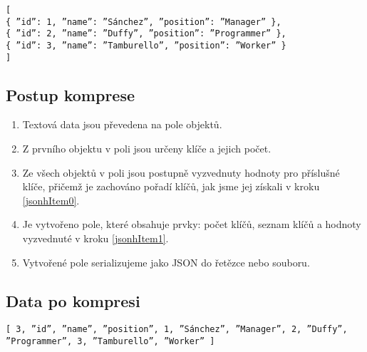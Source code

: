\texttt{[\\
\hspace*{5mm}\{ \textquotedblright id\textquotedblright : 1, \textquotedblright name\textquotedblright : \textquotedblright Sánchez\textquotedblright, \textquotedblright position\textquotedblright : \textquotedblright Manager\textquotedblright\ \},\\
\hspace*{5mm}\{ \textquotedblright id\textquotedblright : 2, \textquotedblright name\textquotedblright : \textquotedblright Duffy\textquotedblright, \textquotedblright position\textquotedblright : \textquotedblright Programmer\textquotedblright\ \},\\
\hspace*{5mm}\{ \textquotedblright id\textquotedblright : 3, \textquotedblright name\textquotedblright : \textquotedblright Tamburello\textquotedblright, \textquotedblright position\textquotedblright : \textquotedblright Worker\textquotedblright\ \}\\
]}

\subsection{Postup komprese}
\begin{enumerate}
\item Textová data jsou převedena na pole objektů.
\item \label{jsonhItem0} Z prvního objektu v poli jsou určeny klíče a jejich počet.
\item \label{jsonhItem1} Ze všech objektů v poli jsou postupně vyzvednuty hodnoty pro příslušné klíče, přičemž je zachováno pořadí klíčů, jak jsme jej získali v kroku \ref{jsonhItem0}.
\item Je vytvořeno pole, které obsahuje prvky: počet klíčů, seznam klíčů a hodnoty vyzvednuté v kroku \ref{jsonhItem1}.
\item Vytvořené pole serializujeme jako JSON do řetězce nebo souboru.
\end{enumerate}

\subsection{Data po kompresi}
\texttt{[ 3, \textquotedblright id\textquotedblright, \textquotedblright name\textquotedblright, \textquotedblright position\textquotedblright, 1, \textquotedblright Sánchez\textquotedblright, \textquotedblright Manager\textquotedblright, 2, \textquotedblright Duffy\textquotedblright,\\
\hspace*{5mm}\textquotedblright Programmer\textquotedblright, 3, \textquotedblright Tamburello\textquotedblright, \textquotedblright Worker\textquotedblright\ ]}

